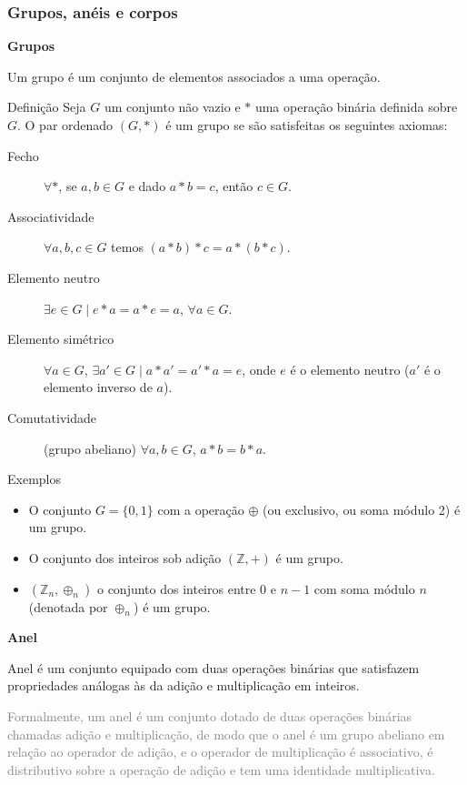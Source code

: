 \begin{frame}[allowframebreaks]
\frametitle{Grupos, anéis e corpos}
\textbf{Grupos}

Um grupo é um conjunto de elementos associados a uma operação.

\begin{block}{Definição}
  Seja $G$ um conjunto não vazio e $*$ uma operação binária definida sobre $G$. O par ordenado $(G,*)$ é um grupo se são satisfeitas os seguintes axiomas:
  \begin{description}
    \item[Fecho] $\forall *$, se $a,b \in G$ e dado $a * b = c$, então $c \in G$.
    \item[Associatividade] $\forall a,b,c \in G$ temos $(a * b) * c = a * (b * c)$.
    \item[Elemento neutro] $\exists e \in G \mid e*a=a*e=a$, $\forall a \in G$.
    \item[Elemento simétrico] $\forall a \in G$, $\exists a' \in G \mid a * a' = a' * a = e$, onde $e$ é o elemento neutro ($a'$ é o elemento inverso de $a$).
    \item[Comutatividade] (grupo abeliano) $\forall a, b \in G$, $a * b = b * a$.
  \end{description}
\end{block}

\framebreak
\begin{block}{Exemplos}
  \begin{itemize}
    \item O conjunto $G=\{0,1\}$ com a operação $\oplus$ (ou exclusivo, ou soma módulo 2) é um grupo.
    \item O conjunto dos inteiros sob adição $(\mathbb{Z},+)$ é um grupo.
    \item $(\mathbb{Z}_n, \oplus_n)$ o conjunto dos inteiros entre $0$ e $n-1$ com soma módulo $n$ (denotada por $\oplus_n$) é um grupo.
  \end{itemize}
\end{block}

\framebreak
\textbf{Anel}

Anel é um conjunto equipado com duas operações binárias que satisfazem propriedades análogas às da adição e multiplicação em inteiros.

\textcolor{gray}{Formalmente, um anel é um conjunto dotado de duas operações binárias chamadas adição e multiplicação, de modo que o anel é um grupo abeliano em relação ao operador de adição, e o operador de multiplicação é associativo, é distributivo sobre a operação de adição e tem uma identidade multiplicativa.}


\end{frame}
